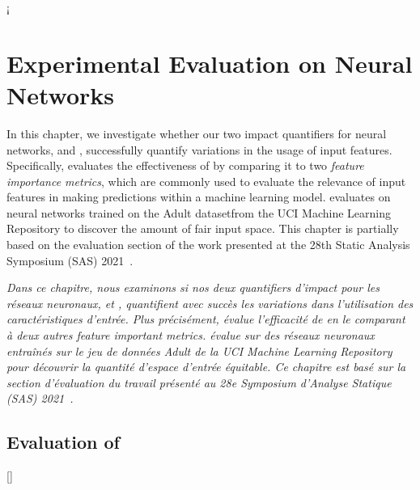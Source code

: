 \setchapterpreamble[u]{\margintoc}¡

\chapter{Experimental Evaluation on Neural Networks}

In this chapter, we investigate whether our two impact quantifiers for neural networks, \cf{} \changesname{} and \qlibraname{}, successfully quantify variations in the usage of input features. Specifically,  evaluates the effectiveness of \changesname{} by comparing it to two \emph{feature importance metrics}, which are commonly used to evaluate the relevance of input features in making predictions within a machine learning model.  evaluates \qlibraname{} on neural networks trained on the Adult dataset\sidenotemark[\ref{adult-url}] from the UCI Machine Learning Repository to discover the amount of fair input space. This chapter is partially based on the evaluation section of the work presented at the 28th Static Analysis Symposium (SAS) 2021~\cite[Section 3]{Mazzucato2021}.

\frenchdiv

\emph{
  Dans ce chapitre, nous examinons si nos deux quantifiers d'impact pour les réseaux neuronaux, \cf{} \changesname{} et \qlibraname{}, quantifient avec succès les variations dans l'utilisation des caractéristiques d'entrée.
  Plus précisément,  évalue l'efficacité de \changesname{} en le comparant à deux autres \emph{feature important metrics}.
   évalue \qlibraname{} sur des réseaux neuronaux entraînés sur le jeu de données Adult de la UCI Machine Learning Repository pour découvrir la quantité d'espace d'entrée équitable.
  Ce chapitre est basé sur la section d'évaluation du travail présenté au 28e Symposium d'Analyse Statique (SAS) 2021~.
}

\section{Evaluation of \changesname{}}[\changesname]



